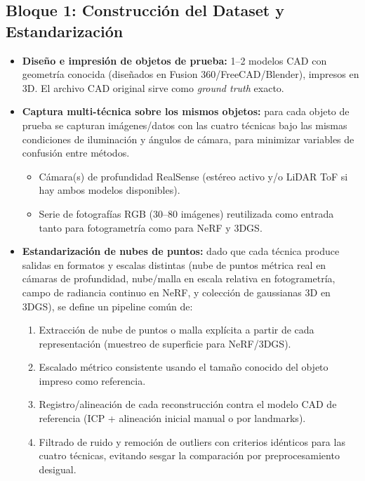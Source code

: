 \documentclass[11pt]{article}
\begin{document}
\subsection{Bloque 1: Construcci\'on del Dataset y Estandarizaci\'on}

\begin{itemize}
    \item \textbf{Dise\~no e impresi\'on de objetos de prueba:} 1--2 modelos CAD con geometr\'ia conocida (dise\~nados en Fusion 360/FreeCAD/Blender), impresos en 3D. El archivo CAD original sirve como \emph{ground truth} exacto.
    \item \textbf{Captura multi-t\'ecnica sobre los mismos objetos:} para cada objeto de prueba se capturan im\'agenes/datos con las cuatro t\'ecnicas bajo las mismas condiciones de iluminaci\'on y \'angulos de c\'amara, para minimizar variables de confusi\'on entre m\'etodos.
    \begin{itemize}
        \item C\'amara(s) de profundidad RealSense (est\'ereo activo y/o LiDAR ToF si hay ambos modelos disponibles).
        \item Serie de fotograf\'ias RGB (30--80 im\'agenes) reutilizada como entrada tanto para fotogrametr\'ia como para NeRF y 3DGS.
    \end{itemize}
    \item \textbf{Estandarizaci\'on de nubes de puntos:} dado que cada t\'ecnica produce salidas en formatos y escalas distintas (nube de puntos m\'etrica real en c\'amaras de profundidad, nube/malla en escala relativa en fotogrametr\'ia, campo de radiancia continuo en NeRF, y colecci\'on de gaussianas 3D en 3DGS), se define un pipeline com\'un de:
    \begin{enumerate}
        \item Extracci\'on de nube de puntos o malla expl\'icita a partir de cada representaci\'on (muestreo de superficie para NeRF/3DGS).
        \item Escalado m\'etrico consistente usando el tama\~no conocido del objeto impreso como referencia.
        \item Registro/alineaci\'on de cada reconstrucci\'on contra el modelo CAD de referencia (ICP + alineaci\'on inicial manual o por landmarks).
        \item Filtrado de ruido y remoci\'on de outliers con criterios id\'enticos para las cuatro t\'ecnicas, evitando sesgar la comparaci\'on por preprocesamiento desigual.
    \end{enumerate}
\end{itemize}
\end{document}
